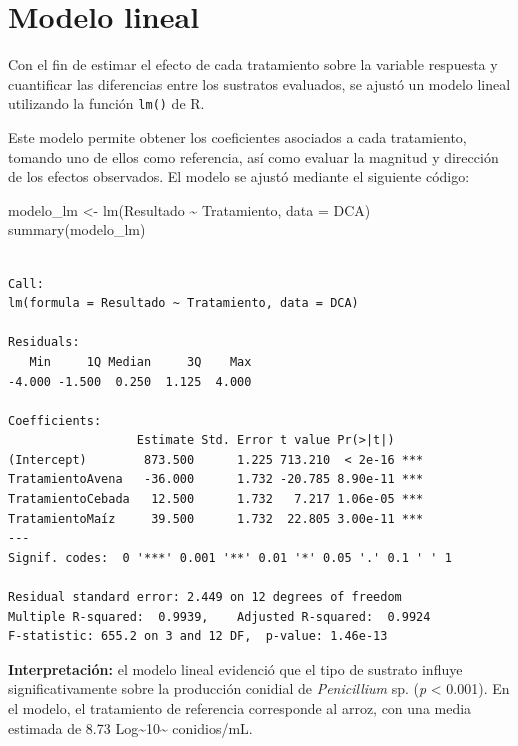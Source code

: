 \documentclass[
  spanish,
  letterpaper,
  DIV=11,
  numbers=noendperiod]{scrreprt}
\newenvironment{Shaded}{\begin{snugshade}}{\end{snugshade}}
\newcommand{\AttributeTok}[1]{\textcolor[rgb]{0.40,0.45,0.13}{#1}}
\newcommand{\FunctionTok}[1]{\textcolor[rgb]{0.28,0.35,0.67}{#1}}
\newcommand{\NormalTok}[1]{\textcolor[rgb]{0.00,0.23,0.31}{#1}}
\newcommand{\OtherTok}[1]{\textcolor[rgb]{0.00,0.23,0.31}{#1}}
\newcommand{\SpecialCharTok}[1]{\textcolor[rgb]{0.37,0.37,0.37}{#1}}
\begin{document}
\section{Modelo lineal}\label{modelo-lineal}

Con el fin de estimar el efecto de cada tratamiento sobre la variable
respuesta y cuantificar las diferencias entre los sustratos evaluados,
se ajustó un modelo lineal utilizando la función \texttt{lm()} de R.

Este modelo permite obtener los coeficientes asociados a cada
tratamiento, tomando uno de ellos como referencia, así como evaluar la
magnitud y dirección de los efectos observados. El modelo se ajustó
mediante el siguiente código:

\begin{Shaded}
\begin{Highlighting}[]
\NormalTok{modelo\_lm }\OtherTok{\textless{}{-}} \FunctionTok{lm}\NormalTok{(Resultado }\SpecialCharTok{\textasciitilde{}}\NormalTok{ Tratamiento, }\AttributeTok{data =}\NormalTok{ DCA)}
\FunctionTok{summary}\NormalTok{(modelo\_lm)}
\end{Highlighting}
\end{Shaded}

\begin{verbatim}

Call:
lm(formula = Resultado ~ Tratamiento, data = DCA)

Residuals:
   Min     1Q Median     3Q    Max 
-4.000 -1.500  0.250  1.125  4.000 

Coefficients:
                  Estimate Std. Error t value Pr(>|t|)    
(Intercept)        873.500      1.225 713.210  < 2e-16 ***
TratamientoAvena   -36.000      1.732 -20.785 8.90e-11 ***
TratamientoCebada   12.500      1.732   7.217 1.06e-05 ***
TratamientoMaíz     39.500      1.732  22.805 3.00e-11 ***
---
Signif. codes:  0 '***' 0.001 '**' 0.01 '*' 0.05 '.' 0.1 ' ' 1

Residual standard error: 2.449 on 12 degrees of freedom
Multiple R-squared:  0.9939,    Adjusted R-squared:  0.9924 
F-statistic: 655.2 on 3 and 12 DF,  p-value: 1.46e-13
\end{verbatim}

\textbf{Interpretación:} el modelo lineal evidenció que el tipo de
sustrato influye significativamente sobre la producción conidial de
\emph{Penicillium} sp. (\emph{p} \textless{} 0.001). En el modelo, el
tratamiento de referencia corresponde al arroz, con una media estimada
de 8.73 Log\textasciitilde10\textasciitilde{} conidios/mL.
\end{document}
